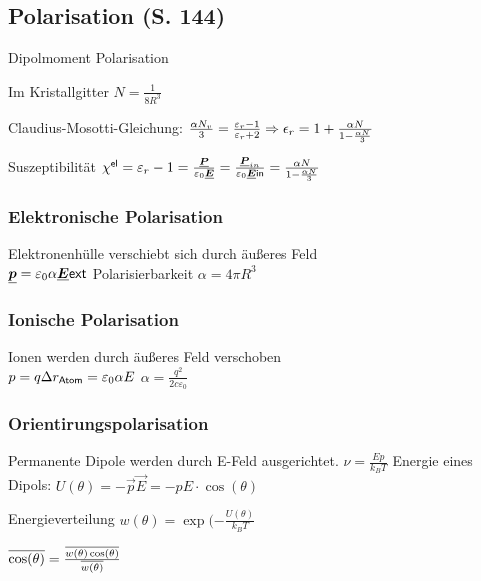 \documentclass[fs, footer]{latex4ei}
\begin{document}
\begin{multicols*}{4}
{	\subsection{Polarisation (S. 144)}

	Dipolmoment  \qquad Polarisation 
	
	Im Kristallgitter $ N = \frac{1}{8 R^3}$
	
	Claudius-Mosotti-Gleichung: $\frac{\alpha N_v}{3} = \frac{\varepsilon_r -1}{\varepsilon_r +2} \Rightarrow  \epsilon_r = 1 + \frac{\alpha N}{1 - \frac{\alpha N }{3}}$
	
	Suszeptibilität $\chi^{\sf el} = \varepsilon_r - 1 = \frac{\underline{\boldsymbol {P}}}{\varepsilon_0 \underline{\boldsymbol {E}}} = \frac{\underline{\boldsymbol {P}}_{in}}{\varepsilon_0 \underline{\boldsymbol {E}}{\sf in}} = \frac{\alpha N}{1- \frac{\alpha N}{3}}$

	\subsubsection*{Elektronische Polarisation} Elektronenhülle verschiebt sich durch äußeres Feld\\
	$\underline{\boldsymbol {p}} = \varepsilon_0 \alpha \underline{\boldsymbol {E}}{\sf ext}$ \qquad Polarisierbarkeit $\alpha = 4\pi R^3$
	
	\subsubsection*{Ionische Polarisation} Ionen werden durch äußeres Feld verschoben\\
	$p = q \Delta r_{\sf Atom} = \varepsilon_0 \alpha E$ \qquad $\alpha = \frac{q^2}{2c \varepsilon_0}$
	
	\subsubsection*{Orientirungspolarisation} Permanente Dipole werden durch E-Feld ausgerichtet.
	$\nu = \frac{E p}{k_B T}$
	Energie eines Dipols: $U(\theta) = -\vec p \vec E = -pE \cdot \cos(\theta)$
	 
	Energieverteilung $w(\theta) = \exp(-\frac{U(\theta)}{k_B T}$
	
	$\overline{\cos(\theta)} = \frac{\overline{w(\theta) \cos(\theta)}}{\overline{w(\theta)}}$
	
}



\end{multicols*}
\end{document}
